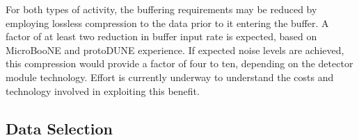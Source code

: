 For both types of activity, the buffering requirements may be reduced by employing lossless compression to the data prior to it entering the buffer.
A factor of at least two reduction in buffer input rate is
expected, based on MicroBooNE and protoDUNE experience. 
If expected noise levels are achieved, this compression would provide a factor of four to ten, depending on the detector module technology.
Effort is currently underway to understand the costs and technology involved in exploiting this benefit.

\subsection{Data Selection}
\label{sec:sp-daq:design-data-selection}







